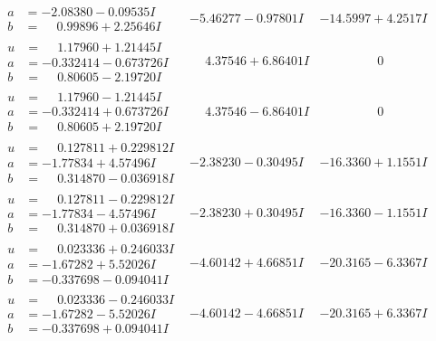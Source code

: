 \documentclass[1p]{elsarticle_modified}
\theoremstyle{definition}
\begin{document}
$$\begin{array}{c|c|c}
\begin{aligned}
a &= -2.08380 - 0.09535 I \\
b &= \phantom{-}0.99896 + 2.25646 I\end{aligned}
 & -5.46277 - 0.97801 I & -14.5997 + 4.2517 I \\ \hline\begin{aligned}
u &= \phantom{-}1.17960 + 1.21445 I \\
a &= -0.332414 - 0.673726 I \\
b &= \phantom{-}0.80605 - 2.19720 I\end{aligned}
 & \phantom{-}4.37546 + 6.86401 I & \phantom{-0.000000 } 0 \\ \hline\begin{aligned}
u &= \phantom{-}1.17960 - 1.21445 I \\
a &= -0.332414 + 0.673726 I \\
b &= \phantom{-}0.80605 + 2.19720 I\end{aligned}
 & \phantom{-}4.37546 - 6.86401 I & \phantom{-0.000000 } 0 \\ \hline\begin{aligned}
u &= \phantom{-}0.127811 + 0.229812 I \\
a &= -1.77834 + 4.57496 I \\
b &= \phantom{-}0.314870 - 0.036918 I\end{aligned}
 & -2.38230 - 0.30495 I & -16.3360 + 1.1551 I \\ \hline\begin{aligned}
u &= \phantom{-}0.127811 - 0.229812 I \\
a &= -1.77834 - 4.57496 I \\
b &= \phantom{-}0.314870 + 0.036918 I\end{aligned}
 & -2.38230 + 0.30495 I & -16.3360 - 1.1551 I \\ \hline\begin{aligned}
u &= \phantom{-}0.023336 + 0.246033 I \\
a &= -1.67282 + 5.52026 I \\
b &= -0.337698 - 0.094041 I\end{aligned}
 & -4.60142 + 4.66851 I & -20.3165 - 6.3367 I \\ \hline\begin{aligned}
u &= \phantom{-}0.023336 - 0.246033 I \\
a &= -1.67282 - 5.52026 I \\
b &= -0.337698 + 0.094041 I\end{aligned}
 & -4.60142 - 4.66851 I & -20.3165 + 6.3367 I\\

\end{array}$$
\end{document}
